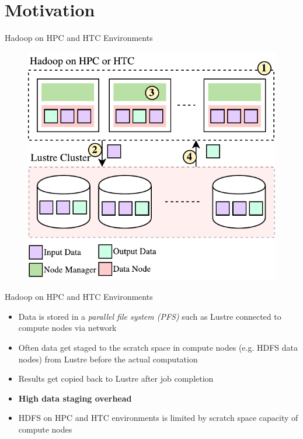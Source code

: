 \documentclass[newPxFont]{beamer}
\begin{document}
\section{Motivation}

\begin{frame}[c]{Hadoop on HPC and HTC Environments}
\begin{figure}[t]
  \includegraphics[scale=0.7]{hadoop-on-hpc-2}
  \centering
\end{figure}
\end{frame}

\begin{frame}[c]{Hadoop on HPC and HTC Environments}
  \begin{itemize}
    \item Data is stored in a \emph{parallel file system (PFS)} such as Lustre connected to compute nodes via network
    \item Often data get staged to the scratch space in compute nodes (e.g. HDFS data nodes) from Lustre before the actual computation
    \item Results get copied back to Lustre after job completion
    \item \textbf{High data staging overhead}
    \item HDFS on HPC and HTC environments is limited by scratch space capacity of compute nodes
  \end{itemize}
\end{frame}
\end{document}
